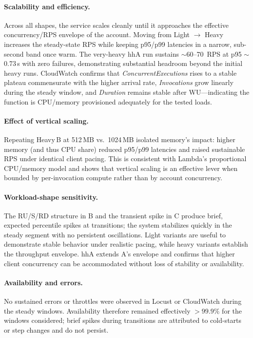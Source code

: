 \documentclass[11pt,a4paper]{article}
\begin{document}
\paragraph{Scalability and efficiency.}
Across all shapes, the service scales cleanly until it approaches the effective concurrency/RPS envelope of the account. Moving from Light \(\rightarrow\) Heavy increases the steady-state RPS while keeping p95/p99 latencies in a narrow, sub-second band once warm. The very-heavy hhA run sustains \(\sim\)60--70~RPS at p95 \(\sim\)0.73\,s with zero failures, demonstrating substantial headroom beyond the initial heavy runs. CloudWatch confirms that \emph{ConcurrentExecutions} rises to a stable plateau commensurate with the higher arrival rate, \emph{Invocations} grow linearly during the steady window, and \emph{Duration} remains stable after WU—indicating the function is CPU/memory provisioned adequately for the tested loads.

\paragraph{Effect of vertical scaling.}
Repeating Heavy\,B at 512\,MB vs.\ 1024\,MB isolated memory’s impact: higher memory (and thus CPU share) reduced p95/p99 latencies and raised sustainable RPS under identical client pacing. This is consistent with Lambda’s proportional CPU\:/\!memory model and shows that vertical scaling is an effective lever when bounded by per-invocation compute rather than by account concurrency.

\paragraph{Workload-shape sensitivity.}
The RU/S/RD structure in B and the transient spike in C produce brief, expected percentile spikes at transitions; the system stabilizes quickly in the steady segment with no persistent oscillations. Light variants are useful to demonstrate stable behavior under realistic pacing, while heavy variants establish the throughput envelope. hhA extends A’s envelope and confirms that higher client concurrency can be accommodated without loss of stability or availability.

\paragraph{Availability and errors.}
No sustained errors or throttles were observed in Locust or CloudWatch during the steady windows. Availability therefore remained effectively \(> 99.9\%\) for the windows considered; brief spikes during transitions are attributed to cold-starts or step changes and do not persist.
\end{document}

